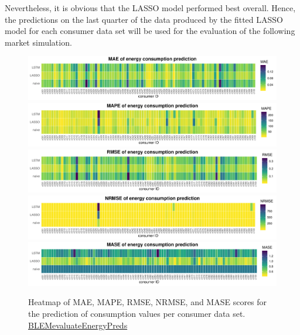 Nevertheless, it is obvious that the LASSO model performed best overall. Hence, the predictions on the last quarter of the data produced by the fitted LASSO model for each consumer data set will be used for the evaluation of the following market simulation.
%
\begin{figure}[htbp]
 \centering
 \includegraphics[width=\textwidth]{thesis/graphs/evaluation/c_heatmap_MAE.pdf}
 \includegraphics[width=\textwidth]{thesis/graphs/evaluation/c_heatmap_MAPE.pdf}
 \includegraphics[width=\textwidth]{thesis/graphs/evaluation/c_heatmap_RMSE.pdf}
 \includegraphics[width=\textwidth]{thesis/graphs/evaluation/c_heatmap_NRMSE.pdf}
 \includegraphics[width=\textwidth]{thesis/graphs/evaluation/c_heatmap_MASE.pdf}
\caption[Heatmaps of error measures for prediction of consumption values]{Heatmap of MAE, MAPE, RMSE, NRMSE, and MASE scores for the prediction of consumption values per consumer data set. \quantnet\href{https://github.com/QuantLet/BLEM/tree/master/BLEMevaluateEnergyPreds}{BLEMevaluateEnergyPreds}}
\label{Fig:heatmaps}
\end{figure}

